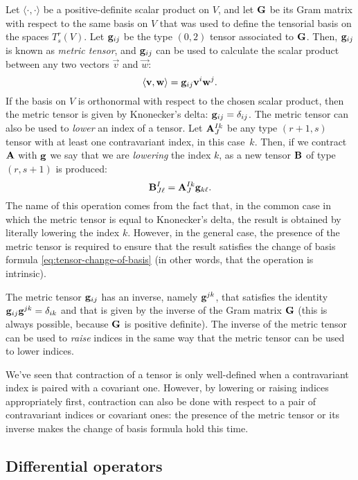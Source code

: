Let $\langle \cdot, \cdot \rangle$ be a positive-definite scalar product
on $V$, and let $\mathbf{G}$ be its Gram matrix with respect to the same
basis on $V$ that was used to define the tensorial basis on the spaces $T^r_s(V)$.
Let $\mathbf{g}_{ij}$ be the type $(0,2)$ tensor associated to $\mathbf{G}$.
Then, $\mathbf{g}_{ij}$ is known as \emph{metric tensor}, and $\mathbf{g}_{ij}$
can be used to calculate the scalar product between any two vectors
$\vec{v}$ and $\vec{w}$:
\[
\langle \mathbf{v}, \mathbf{w} \rangle = \mathbf{g}_{ij} \mathbf{v}^i \mathbf{w}^j.
\]
If the basis on $V$ is orthonormal with respect to the chosen scalar
product, then the metric tensor is given by Knonecker's delta:
$\mathbf{g}_{ij} = \delta_{ij}$. The metric tensor can also be used
to \emph{lower} an index of a tensor. Let $\mathbf{A}^{Ik}_J$ be
any type $(r+1,s)$ tensor with at least one contravariant index,
in this case~$k$. Then, if we contract $\mathbf{A}$ with $\mathbf{g}$ we
say that we are \emph{lowering} the index $k$, as a new tensor $\mathbf{B}$
of type $(r,s+1)$ is produced:
\[
\mathbf{B}^I_{J \ell} = \mathbf{A}^{Ik}_J \mathbf{g}_{k \ell}.
\]
The name of this operation comes from the fact that, in the common case in which
the metric tensor is equal to Knonecker's delta, the result is obtained by
literally lowering the index $k$. However, in the general case, the
presence of the metric tensor is required to ensure that the result
satisfies the change of basis formula \eqref{eq:tensor-change-of-basis}
(in other words, that the operation is intrinsic).

The metric tensor $\mathbf{g}_{ij}$ has an inverse, namely $\mathbf{g}^{jk}$,
that satisfies the identity $\mathbf{g}_{ij} \mathbf{g}^{jk} = \delta_{ik}$
and that is given by the inverse of the Gram matrix $\mathbf{G}$
(this is always possible, because $\mathbf{G}$ is positive definite).
The inverse of the metric tensor can be used to \emph{raise} indices
in the same way that the metric tensor can be used to lower indices.

We've seen that contraction of a tensor is only well-defined when
a contravariant index is paired with a covariant one.
However, by lowering or raising indices appropriately first, contraction
can also be done with respect to a pair of contravariant indices
or covariant ones: the presence of the metric tensor or its inverse
makes the change of basis formula hold this time.

\subsection*{Differential operators}

